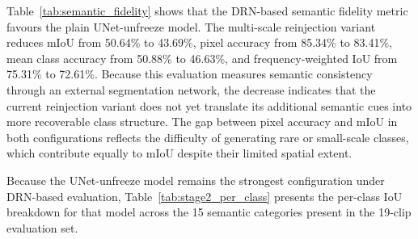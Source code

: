 Table~\ref{tab:semantic_fidelity} shows that the DRN-based semantic fidelity metric favours the plain UNet-unfreeze model. The multi-scale reinjection variant reduces mIoU from 50.64\% to 43.69\%, pixel accuracy from 85.34\% to 83.41\%, mean class accuracy from 50.88\% to 46.63\%, and frequency-weighted IoU from 75.31\% to 72.61\%. Because this evaluation measures semantic consistency through an external segmentation network, the decrease indicates that the current reinjection variant does not yet translate its additional semantic cues into more recoverable class structure. The gap between pixel accuracy and mIoU in both configurations reflects the difficulty of generating rare or small-scale classes, which contribute equally to mIoU despite their limited spatial extent.

Because the UNet-unfreeze model remains the strongest configuration under DRN-based evaluation, Table~\ref{tab:stage2_per_class} presents the per-class IoU breakdown for that model across the 15 semantic categories present in the 19-clip evaluation set.

